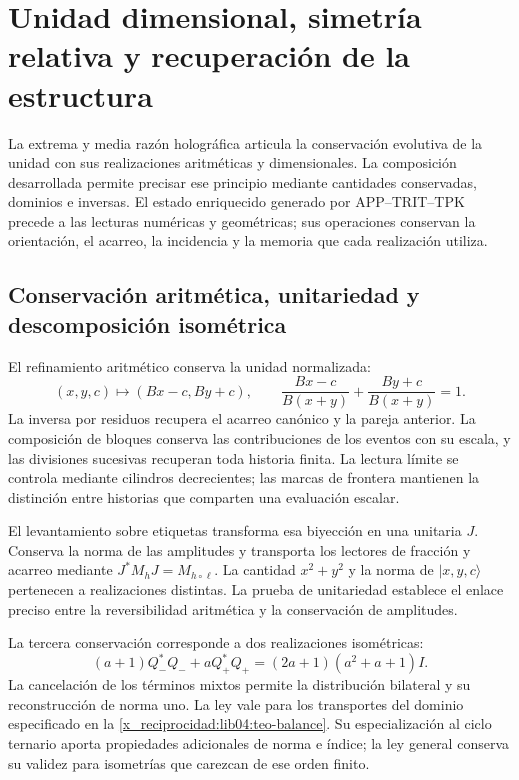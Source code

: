 \chapter{Unidad dimensional, simetría relativa y recuperación de la estructura}
\label{x_reciprocidad:lib06:sintesis}

La extrema y media razón holográfica articula la conservación evolutiva
de la unidad con sus realizaciones aritméticas y dimensionales. La
composición desarrollada permite precisar ese principio mediante
cantidades conservadas, dominios e inversas. El estado enriquecido
generado por APP--TRIT--TPK precede a las lecturas numéricas y
geométricas; sus operaciones conservan la orientación, el acarreo,
la incidencia y la memoria que cada realización utiliza.

\section{Conservación aritmética, unitariedad y descomposición isométrica}
\label{x_reciprocidad:lib06:tres-conservaciones}

El refinamiento aritmético conserva la unidad normalizada:
\begin{equation}
 (x,y,c)\longmapsto(Bx-c,By+c),\qquad
 \frac{Bx-c}{B(x+y)}+\frac{By+c}{B(x+y)}=1.
 \label{x_reciprocidad:lib06:unidad}
\end{equation}
La inversa por residuos recupera el acarreo canónico y la pareja
anterior. La composición de bloques conserva las contribuciones de
los eventos con su escala, y las divisiones sucesivas recuperan toda
historia finita. La lectura límite se controla mediante cilindros
decrecientes; las marcas de frontera mantienen la distinción entre
historias que comparten una evaluación escalar.

El levantamiento sobre etiquetas transforma esa biyección en una
unitaria \(J\). Conserva la norma de las amplitudes y transporta
los lectores de fracción y acarreo mediante
\(J^*M_hJ=M_{h\circ\ell}\). La cantidad \(x^2+y^2\) y la norma
de \(|x,y,c\rangle\) pertenecen a realizaciones distintas. La
prueba de unitariedad establece el enlace preciso entre la
reversibilidad aritmética y la conservación de amplitudes.

La tercera conservación corresponde a dos realizaciones isométricas:
\begin{equation}
 (a+1)Q_-^*Q_-+aQ_+^*Q_+
 =(2a+1)(a^2+a+1)I.
 \label{x_reciprocidad:lib06:balance}
\end{equation}
La cancelación de los términos mixtos permite la distribución
bilateral y su reconstrucción de norma uno. La ley vale para los
transportes del dominio especificado en la
\cref{x_reciprocidad:lib04:teo-balance}. Su especialización al ciclo ternario
aporta propiedades adicionales de norma e índice; la ley general
conserva su validez para isometrías que carezcan de ese orden finito.

